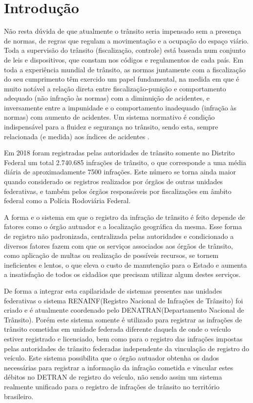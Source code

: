 \chapter[Introdução]{Introdução}




Não resta dúvida de que atualmente o trânsito seria impensado sem a presença de normas, de regras que regulam a movimentação e a ocupação do espaço viário. Toda a supervisão do trânsito (fiscalização, controle) está baseada num conjunto de leis e dispositivos, que constam nos códigos e regulamentos de cada país. Em toda a experiência mundial de trânsito, as normas juntamente com a fiscalização do seu cumprimento têm exercido um papel fundamental, na medida em que é muito notável a relação direta entre fiscalização-punição e comportamento adequado (não infração às normas) com a diminuição de acidentes, e inversamente entre a impunidade e o comportamento inadequado (infração às normas) com aumento de acidentes. Um sistema normativo é condição indispensável para a fluidez e segurança no trânsito, sendo esta, sempre relacionada (e medida) aos índices de acidentes \cite{article_transito_alcool}.

Em 2018 foram registradas pelas autoridades de trânsito somente no Distrito Federal um total 2.740.685 infrações de trânsito, o que corresponde a uma média diária de aproximadamente 7500 infrações. Este número se torna ainda maior quando considerado os registros realizados por órgãos de outras unidades federativas, e também pelos órgãos responsáveis por fiscalizações em âmbito federal como a Polícia Rodoviária Federal.

A forma e o sistema em que o registro da infração de trânsito é feito depende de fatores como o órgão autuador e a localização geográfica da mesma. Esse forma de registro não padronizada, centralizada pelas autoridades e condicionado a diversos fatores fazem com que os serviços associados aos órgãos de trânsito, como aplicação de multas ou realização de possíveis recursos, se tornem ineficientes e lentos, o que eleva o custo de manutenção para o Estado e aumenta a insatisfação de todos os cidadãos que precisam utilizar algum destes serviços.

De forma a integrar esta capilaridade de sistemas presentes nas unidades federativas o sistema RENAINF(Registro Nacional de Infrações de Trânsito) foi criado e é atualmente coordenado pelo DENATRAN(Departamento Nacional de Trânsito). Porém este sistema somente é utilizado para registrar as infrações de trânsito cometidas em unidade federada diferente daquela de onde o veículo estiver registrado e licenciado, bem como para o registro das infrações impostas pelas autoridades de trânsito federadas independente da vinculação de registro do veículo. Este sistema possibilita que o órgão autuador obtenha os dados necessárias para registrar a informação da infração cometida e vincular estes débitos no DETRAN de registro do veículo, não sendo assim um sistema realmente unificado para o registro de infrações de trânsito no território brasileiro.\cite{renainf_fazenda_sp}

